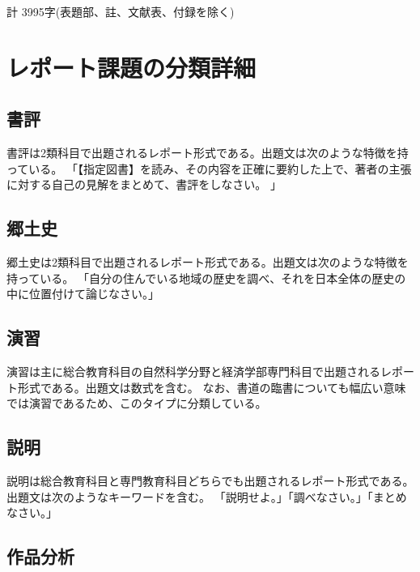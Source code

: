 \documentclass[11pt,a4paper,uplatex]{jsarticle}
\begin{document}
計 3995字(表題部、註、文献表、付録を除く)

\clearpage

\section*{レポート課題の分類詳細}

\subsection*{書評}

書評は2類科目で出題されるレポート形式である。出題文は次のような特徴を持っている。
「【指定図書】を読み、その内容を正確に要約した上で、著者の主張に対する自己の見解をまとめて、書評をしなさい。
」

\subsection*{郷土史}

郷土史は2類科目で出題されるレポート形式である。出題文は次のような特徴を持っている。
「自分の住んでいる地域の歴史を調べ、それを日本全体の歴史の中に位置付けて論じなさい。」

\subsection*{演習}

演習は主に総合教育科目の自然科学分野と経済学部専門科目で出題されるレポート形式である。出題文は数式を含む。
なお、書道の臨書についても幅広い意味では演習であるため、このタイプに分類している。

\subsection*{説明}

説明は総合教育科目と専門教育科目どちらでも出題されるレポート形式である。出題文は次のようなキーワードを含む。
「説明せよ。」「調べなさい。」「まとめなさい。」

\subsection*{作品分析}
\end{document}
